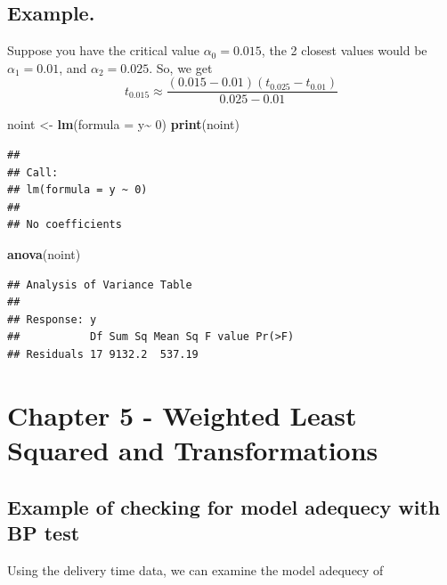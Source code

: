 \documentclass[
  11pt,
]{article}
\newenvironment{Shaded}{\begin{snugshade}}{\end{snugshade}}
\newcommand{\AttributeTok}[1]{\textcolor[rgb]{0.13,0.29,0.53}{#1}}
\newcommand{\DecValTok}[1]{\textcolor[rgb]{0.00,0.00,0.81}{#1}}
\newcommand{\FunctionTok}[1]{\textcolor[rgb]{0.13,0.29,0.53}{\textbf{#1}}}
\newcommand{\NormalTok}[1]{#1}
\newcommand{\OtherTok}[1]{\textcolor[rgb]{0.56,0.35,0.01}{#1}}
\newcommand{\SpecialCharTok}[1]{\textcolor[rgb]{0.81,0.36,0.00}{\textbf{#1}}}
\begin{document}
\subsection{Example.}\label{example.}

Suppose you have the critical value \(\alpha_0 = 0.015\), the 2 closest
values would be \(\alpha_1 = 0.01\), and \(\alpha_2 = 0.025\). So, we
get
\[t_{0.015} \approx \frac{(0.015 - 0.01)(t_{0.025} - t_{0.01})}{0.025 - 0.01}\]

\begin{Shaded}
\begin{Highlighting}[]
\NormalTok{noint }\OtherTok{\textless{}{-}} \FunctionTok{lm}\NormalTok{(}\AttributeTok{formula =}\NormalTok{ y}\SpecialCharTok{\textasciitilde{}} \DecValTok{0}\NormalTok{)}
\FunctionTok{print}\NormalTok{(noint)}
\end{Highlighting}
\end{Shaded}

\begin{verbatim}
## 
## Call:
## lm(formula = y ~ 0)
## 
## No coefficients
\end{verbatim}

\begin{Shaded}
\begin{Highlighting}[]
\FunctionTok{anova}\NormalTok{(noint)}
\end{Highlighting}
\end{Shaded}

\begin{verbatim}
## Analysis of Variance Table
## 
## Response: y
##           Df Sum Sq Mean Sq F value Pr(>F)
## Residuals 17 9132.2  537.19
\end{verbatim}

\section{Chapter 5 - Weighted Least Squared and
Transformations}\label{chapter-5---weighted-least-squared-and-transformations}

\subsection{Example of checking for model adequecy with BP
test}\label{example-of-checking-for-model-adequecy-with-bp-test}

Using the delivery time data, we can examine the model adequecy of
\end{document}
